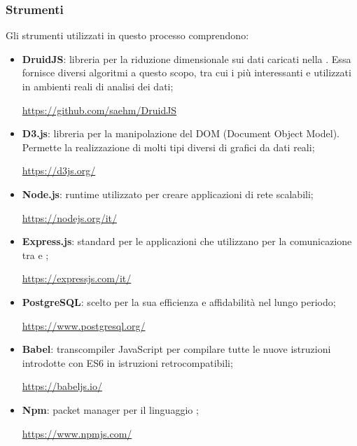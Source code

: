 \subsubsection{Strumenti}
Gli strumenti utilizzati in questo processo comprendono:
\begin{itemize}
	\item \textbf{DruidJS}: libreria per la riduzione dimensionale sui dati caricati nella . Essa fornisce diversi algoritmi a questo scopo, tra cui i più interessanti e utilizzati in ambienti reali di analisi dei dati;
	\begin{center}
		\textcolor{blue}{\url{https://github.com/saehm/DruidJS}}
	\end{center}	  
	\item \textbf{D3.js}: libreria per la manipolazione del DOM (Document Object Model). Permette la realizzazione di molti tipi diversi di grafici da dati reali;
	\begin{center}
		\textcolor{blue}{\url{https://d3js.org/}}
	\end{center}
	\item \textbf{Node.js}: runtime  utilizzato per creare applicazioni di rete scalabili;
	\begin{center}
		\textcolor{blue}{\url{https://nodejs.org/it/}}
	\end{center}
	\item \textbf{Express.js}:  standard per le applicazioni che utilizzano  per la comunicazione tra  e ;
	\begin{center}
		\textcolor{blue}{\url{https://expressjs.com/it/}}
	\end{center}
	\item \textbf{PostgreSQL}:  scelto per la sua efficienza e affidabilità nel lungo periodo;
		\begin{center}
		\textcolor{blue}{\url{https://www.postgresql.org/}}
	\end{center}
	\item \textbf{Babel}: transcompiler {JavaScript} per compilare tutte le nuove istruzioni introdotte con ES6 in istruzioni retrocompatibili;
	\begin{center}
		\textcolor{blue}{\url{https://babeljs.io/}}
	\end{center}
	\item \textbf{Npm}: packet manager per il linguaggio ;
	\begin{center}
		\textcolor{blue}{\url{https://www.npmjs.com/}}

\end{center}
\end{itemize}
